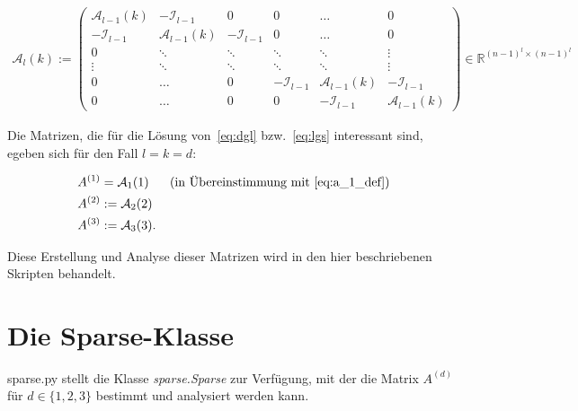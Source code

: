 \documentclass[a4paper,10pt,ngerman, openright]{sphinxmanual}
\begin{document}
\begin{align}
\mathcal{A}_l(k):=
\begin{pmatrix}
\mathcal{A}_{l-1}(k) & -\mathcal{I}_{l-1} & 0 & 0 & \dots & 0\\
-\mathcal{I}_{l-1} & \mathcal{A}_{l-1}(k) & -\mathcal{I}_{l-1} & 0 & \dots & 0\\
0 & \ddots & \ddots & \ddots & \ddots & \vdots \\
\vdots & \ddots & \ddots & \ddots & \ddots & \vdots \\
0 & \dots & 0 & -\mathcal{I}_{l-1} & \mathcal{A}_{l-1}(k) & -\mathcal{I}_{l-1} \\
0 & \dots & 0 & 0 & -\mathcal{I}_{l-1} & \mathcal{A}_{l-1}(k)
\end{pmatrix} \in \mathbb{R}^{(n-1)^l\times(n-1)^l}
\end{align}

Die Matrizen, die für die Lösung von~\eqref{eq:dgl}  bzw.~\eqref{eq:lgs} interessant sind, egeben sich für den Fall $l=k=d$:

\begin{align}
A^{(1)}&=\mathcal{A}_1(1)\text{~~~~~(in Übereinstimmung mit \eqref{eq:a_1_def})}\\
A^{(2)}&:=\mathcal{A}_2(2)\\
A^{(3)}&:=\mathcal{A}_3(3).
\end{align}

Diese Erstellung und Analyse dieser Matrizen wird in den hier beschriebenen Skripten behandelt.

\chapter{Die Sparse-Klasse}
\label{\detokenize{index:welcome-to-schnittstellendokumentation-serie-2-s-documentation}}\label{\detokenize{index:module-sparse}}\label{\detokenize{index:die-sparse-klasse}}
sparse.py stellt die Klasse \emph{sparse.Sparse} zur Verfügung, mit der die Matrix $A^{(d)}$ für $d\in\{1,2,3\}$
bestimmt und analysiert werden kann.
\end{document}
